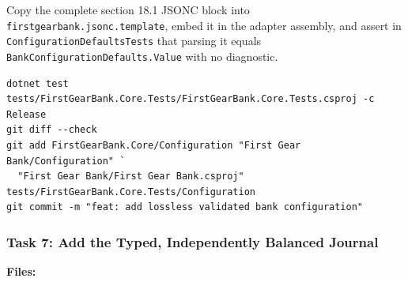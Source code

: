 \documentclass[
  10pt,
  letterpaper,
]{article}
\begin{document}
Copy the complete section 18.1 JSONC block into
\texttt{firstgearbank.}\allowbreak{}\texttt{jsonc.}\allowbreak{}\texttt{template},
embed it in the adapter assembly, and assert in
\texttt{ConfigurationDefaultsTests} that parsing it equals
\texttt{BankConfigurationDefaults.}\allowbreak{}\texttt{Value} with no
diagnostic.

\begin{lstlisting}
dotnet test tests/FirstGearBank.Core.Tests/FirstGearBank.Core.Tests.csproj -c Release
git diff --check
git add FirstGearBank.Core/Configuration "First Gear Bank/Configuration" `
  "First Gear Bank/First Gear Bank.csproj" tests/FirstGearBank.Core.Tests/Configuration
git commit -m "feat: add lossless validated bank configuration"
\end{lstlisting}

\subsubsection{Task 7: Add the Typed, Independently Balanced
Journal}\label{task-7-add-the-typed-independently-balanced-journal}

\textbf{Files:}
\end{document}
